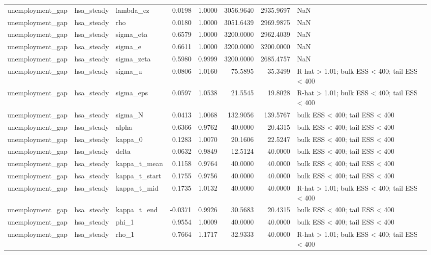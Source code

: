 \begin{tabular}{lllrrrrl}
unemployment\_gap & hsa\_steady & lambda\_ez & 0.0198 & 1.0000 & 3056.9640 & 2935.9697 & NaN \\
unemployment\_gap & hsa\_steady & rho & 0.0180 & 1.0000 & 3051.6439 & 2969.9875 & NaN \\
unemployment\_gap & hsa\_steady & sigma\_eta & 0.6579 & 1.0000 & 3200.0000 & 2962.4039 & NaN \\
unemployment\_gap & hsa\_steady & sigma\_e & 0.6611 & 1.0000 & 3200.0000 & 3200.0000 & NaN \\
unemployment\_gap & hsa\_steady & sigma\_zeta & 0.5980 & 0.9999 & 3200.0000 & 2685.4757 & NaN \\
unemployment\_gap & hsa\_steady & sigma\_u & 0.0806 & 1.0160 & 75.5895 & 35.3499 & R-hat > 1.01; bulk ESS < 400; tail ESS < 400 \\
unemployment\_gap & hsa\_steady & sigma\_eps & 0.0597 & 1.0538 & 21.5545 & 19.8028 & R-hat > 1.01; bulk ESS < 400; tail ESS < 400 \\
unemployment\_gap & hsa\_steady & sigma\_N & 0.0413 & 1.0068 & 132.9056 & 139.5767 & bulk ESS < 400; tail ESS < 400 \\
unemployment\_gap & hsa\_steady & alpha & 0.6366 & 0.9762 & 40.0000 & 20.4315 & bulk ESS < 400; tail ESS < 400 \\
unemployment\_gap & hsa\_steady & kappa\_0 & 0.1283 & 1.0070 & 20.1606 & 22.5247 & bulk ESS < 400; tail ESS < 400 \\
unemployment\_gap & hsa\_steady & delta & 0.0632 & 0.9849 & 12.5124 & 40.0000 & bulk ESS < 400; tail ESS < 400 \\
unemployment\_gap & hsa\_steady & kappa\_t\_mean & 0.1158 & 0.9764 & 40.0000 & 40.0000 & bulk ESS < 400; tail ESS < 400 \\
unemployment\_gap & hsa\_steady & kappa\_t\_start & 0.1755 & 0.9756 & 40.0000 & 40.0000 & bulk ESS < 400; tail ESS < 400 \\
unemployment\_gap & hsa\_steady & kappa\_t\_mid & 0.1735 & 1.0132 & 40.0000 & 40.0000 & R-hat > 1.01; bulk ESS < 400; tail ESS < 400 \\
unemployment\_gap & hsa\_steady & kappa\_t\_end & -0.0371 & 0.9926 & 30.5683 & 20.4315 & bulk ESS < 400; tail ESS < 400 \\
unemployment\_gap & hsa\_steady & phi\_1 & 0.9554 & 1.0009 & 40.0000 & 40.0000 & bulk ESS < 400; tail ESS < 400 \\
unemployment\_gap & hsa\_steady & rho\_1 & 0.7664 & 1.1717 & 32.9333 & 40.0000 & R-hat > 1.01; bulk ESS < 400; tail ESS < 400 \\

\end{tabular}
